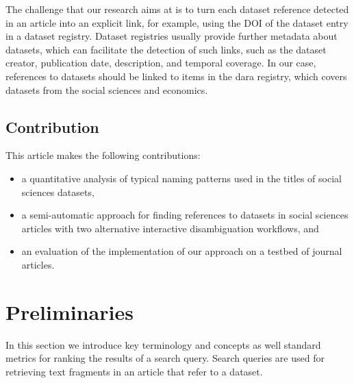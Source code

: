 \documentclass{IOS-Book-Article}
\newcommand{\dara}{\textsf{da\textbar ra}}
\begin{document}
The challenge that our research aims at is to turn each dataset reference detected in an article into an explicit link, for example, using the DOI of the dataset entry in a dataset registry. 
Dataset registries usually provide further metadata about datasets, which can facilitate the detection of such links, such as the dataset creator, publication date, description, and temporal coverage.
In our case, references to datasets should be linked to items in the {\dara} registry, which covers datasets from the social sciences and economics.

\subsection{Contribution}

This article makes the following contributions:
\begin{itemize}
\item a quantitative analysis of typical naming patterns used in the titles of social sciences datasets,
\item a semi-automatic approach for finding references to datasets in social sciences articles with two alternative interactive disambiguation workflows, and
\item an evaluation of the implementation of our approach on a testbed of journal articles.  
\end{itemize}

\section{Preliminaries}
\label{sec:preliminaries}
In this section we introduce key terminology and concepts as well standard metrics for ranking the results of a search query.
Search queries are used for retrieving text fragments in an article that refer to a dataset.
\end{document}
